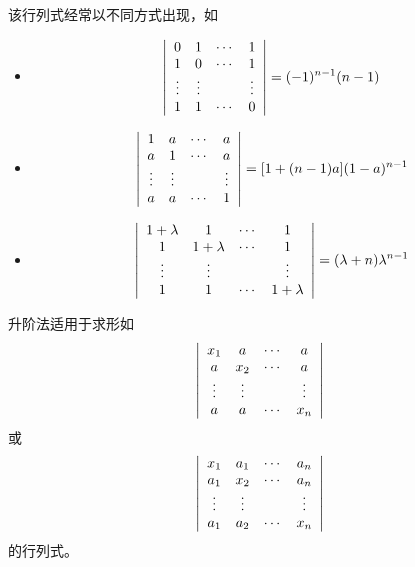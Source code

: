 \begin{zhu}
  该行列式经常以不同方式出现，如
  \begin{itemize}
  \item
    $$
    \left|
      \begin{array}{cccc}
        0  &  1  & \cdots & 1   \\
        1  &  0  & \cdots & 1   \\
        \vdots& \vdots &     & \vdots \\
        1  &  1  & \cdots & 0 
      \end{array}
    \right|   = (-1)^{n-1}(n-1)
    $$ 
  \item
    $$
    \left|
      \begin{array}{cccc}
        1  &  a  & \cdots & a   \\
        a  &  1  & \cdots & a   \\
        \vdots& \vdots &     & \vdots \\
        a  &  a  & \cdots & 1
      \end{array}
    \right| 
    = [1+(n-1)a](1-a)^{n-1}
    $$ 
  \item
    $$
    \left|
      \begin{array}{cccc}
        1+\lambda  &  1  & \cdots & 1   \\
        1  &  1+\lambda  & \cdots & 1   \\
        \vdots& \vdots &     & \vdots \\
        1  &  1  & \cdots & 1+\lambda 
      \end{array}
    \right| 
    = (\lambda+n)\lambda^{n-1}
    $$
  \end{itemize}

  升阶法适用于求形如
  $$
  \left|
    \begin{array}{cccc}
      x_1 &  a  & \cdots & a   \\
      a   & x_2 & \cdots & a   \\
      \vdots & \vdots &     & \vdots \\
      a   &  a  & \cdots & x_n
    \end{array}
  \right|
  $$
  或
  $$
  \left|
    \begin{array}{cccc}
      x_1 & a_1  & \cdots & a_n   \\
      a_1 & x_2 & \cdots  & a_n   \\
      \vdots & \vdots &     & \vdots \\
      a_1 & a_2  & \cdots & x_n
    \end{array}
  \right|
  $$      
  的行列式。
\end{zhu}

